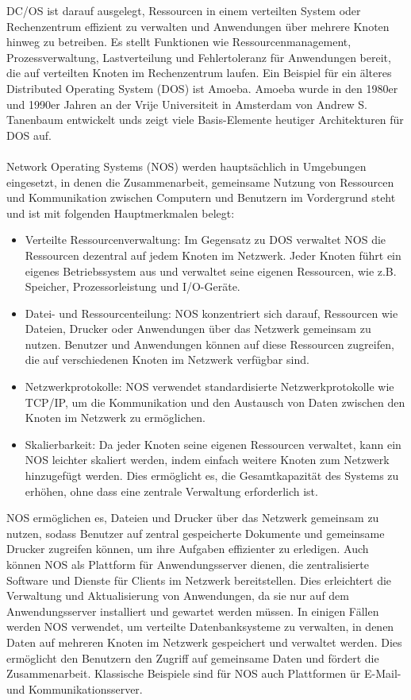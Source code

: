 DC/OS ist darauf ausgelegt, Ressourcen in einem verteilten System oder Rechenzentrum effizient zu verwalten und Anwendungen über mehrere Knoten hinweg zu betreiben. Es stellt Funktionen wie Ressourcenmanagement, Prozessverwaltung, Lastverteilung und Fehlertoleranz für Anwendungen bereit, die auf verteilten Knoten im Rechenzentrum laufen. Ein Beispiel für ein  älteres Distributed Operating System (DOS) ist Amoeba. Amoeba wurde in den 1980er und 1990er Jahren an der Vrije Universiteit in Amsterdam von Andrew S. Tanenbaum entwickelt unds zeigt viele Basis-Elemente heutiger Architekturen für DOS auf. 
\\\\
Network Operating Systems (NOS) werden hauptsächlich in Umgebungen eingesetzt, in denen die Zusammenarbeit, gemeinsame Nutzung von Ressourcen und Kommunikation zwischen Computern und Benutzern im Vordergrund steht und ist mit folgenden Hauptmerkmalen belegt: 
\begin{itemize}
\item Verteilte Ressourcenverwaltung: Im Gegensatz zu DOS verwaltet NOS die Ressourcen dezentral auf jedem Knoten im Netzwerk. Jeder Knoten führt ein eigenes Betriebssystem aus und verwaltet seine eigenen Ressourcen, wie z.B. Speicher, Prozessorleistung und I/O-Geräte.
\item Datei- und Ressourcenteilung: NOS konzentriert sich darauf, Ressourcen wie Dateien, Drucker oder Anwendungen über das Netzwerk gemeinsam zu nutzen. Benutzer und Anwendungen können auf diese Ressourcen zugreifen, die auf verschiedenen Knoten im Netzwerk verfügbar sind.
\item Netzwerkprotokolle: NOS verwendet standardisierte Netzwerkprotokolle wie TCP/IP, um die Kommunikation und den Austausch von Daten zwischen den Knoten im Netzwerk zu ermöglichen.
\item Skalierbarkeit: Da jeder Knoten seine eigenen Ressourcen verwaltet, kann ein NOS leichter skaliert werden, indem einfach weitere Knoten zum Netzwerk hinzugefügt werden. Dies ermöglicht es, die Gesamtkapazität des Systems zu erhöhen, ohne dass eine zentrale Verwaltung erforderlich ist.
\end{itemize}

NOS ermöglichen es, Dateien und Drucker über das Netzwerk gemeinsam zu nutzen, sodass Benutzer auf zentral gespeicherte Dokumente und gemeinsame Drucker zugreifen können, um ihre Aufgaben effizienter zu erledigen. Auch können NOS als Plattform für Anwendungsserver dienen, die zentralisierte Software und Dienste für Clients im Netzwerk bereitstellen. Dies erleichtert die Verwaltung und Aktualisierung von Anwendungen, da sie nur auf dem Anwendungsserver installiert und gewartet werden müssen. In einigen Fällen werden NOS verwendet, um verteilte Datenbanksysteme zu verwalten, in denen Daten auf mehreren Knoten im Netzwerk gespeichert und verwaltet werden. Dies ermöglicht den Benutzern den Zugriff auf gemeinsame Daten und fördert die Zusammenarbeit. Klassische Beispiele sind für NOS auch Plattformen ür E-Mail- und Kommunikationsserver.

